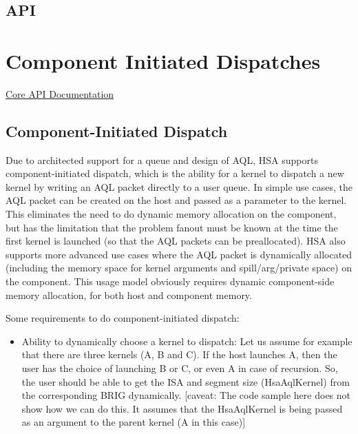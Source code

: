 \documentclass{book}
\begin{document}
\begin{appendices}
\newpage
\hypertarget{Images API}{\section{API} \label{images_api}}


\chapter{Component Initiated Dispatches} \label{architected}
\hypertarget{architectedchptr}{}
\hyperlink{coreapi}{Core API
Documentation}\hypertarget{coreapi_dtde}{}\section{Component-\/\-Initiated
Dispatch}\label{coreapi_dtde}

Due to architected support for a queue and design of AQL,
HSA supports component-\/initiated dispatch, which is the ability
for a kernel to dispatch a new kernel by writing an AQL packet
directly to a user queue. In simple use cases, the AQL packet
can be created on the host and passed as a parameter to the kernel.
This eliminates the need to do dynamic memory allocation on the
component, but has the limitation that the problem fanout must be known
at the time the first kernel is launched (so that the AQL
packets can be preallocated). HSA also supports more advanced
use cases where the AQL packet is dynamically allocated
(including the memory space for kernel arguments and
spill/arg/private space) on the component. This usage model obviously
requires dynamic component-\/side memory allocation, for both host and
component memory.

Some requirements to do component-\/initiated dispatch\-:

\begin{itemize}

\item Ability to dynamically choose a kernel to dispatch\-: Let us
assume for example that there are three kernels (A, B and C). If the
host launches A, then the user has the choice of launching B or C,
or even A in case of recursion. So, the user should be able to get
the ISA and segment size (Hsa\-Aql\-Kernel) from the
corresponding BRIG dynamically. \mbox{[}caveat\-: The code
sample here does not show how we can do this. It assumes that the
Hsa\-Aql\-Kernel is being passed as an argument to the parent kernel
(A in this case)\mbox{]}


\end{itemize}
\end{appendices}
\end{document}
